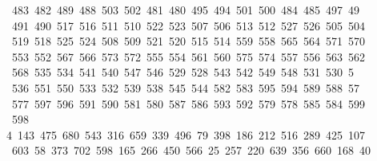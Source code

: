 \begin{tabbing}
\ 483\ 482\ 489\ 488\ 503\ 502\ 481\ 480\ 495\ 494\ 501\ 500\ 484\ 485\ 497\ 49\\[0pt]
\ 491\ 490\ 517\ 516\ 511\ 510\ 522\ 523\ 507\ 506\ 513\ 512\ 527\ 526\ 505\ 504\\[0pt]
\>\ 519\ 518\ 525\ 524\ 508\ 509\ 521\ 520\ 515\ 514\ 559\ 558\ 565\ 564\ 571\ 570\\[0pt]
\>\ 553\ 552\ 567\ 566\ 573\ 572\ 555\ 554\ 561\ 560\ 575\ 574\ 557\ 556\ 563\ 562\ \\[0pt]
\ 568\ 535\ 534\ 541\ 540\ 547\ 546\ 529\ 528\ 543\ 542\ 549\ 548\ 531\ 530\ 5\\[0pt]
\ 536\ 551\ 550\ 533\ 532\ 539\ 538\ 545\ 544\ 582\ 583\ 595\ 594\ 589\ 588\ 57\\[0pt]
\ 577\ 597\ 596\ 591\ 590\ 581\ 580\ 587\ 586\ 593\ 592\ 579\ 578\ 585\ 584\ 599\\[0pt]
\>\ 598\ \\[0pt]
4\ 143\ 475\ 680\ 543\ 316\ 659\ 339\ 496\ 79\ 398\ 186\ 212\ 516\ 289\ 425\ 107\\[0pt]
\>\ 603\ 58\ 373\ 702\ 598\ 165\ 266\ 450\ 566\ 25\ 257\ 220\ 639\ 356\ 660\ 168\ 40\\[0pt]

\end{tabbing}
